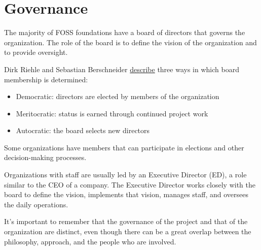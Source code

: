 


\chapter{Governance}

The majority of FOSS foundations have a board of directors that governs the organization.  The role of the board is to define the vision of the organization and to provide oversight.

Dirk Riehle and Sebastian Berschneider \href{https://doi.org/10.1007/978-3-642-33442-9_2}{describe} three ways in which board membership is determined:

\begin{itemize}

\item Democratic: directors are elected by members of the organization

\item Meritocratic: status is earned through continued project work

\item Autocratic: the board selects new directors

\end{itemize}

Some organizations have members that can participate in elections and other decision-making processes.

Organizations with staff are usually led by an Executive Director (ED), a role similar to the CEO of a company.  The Executive Director works closely with the board to define the vision, implements that vision, manages staff, and oversees the daily operations.

It's important to remember that the governance of the project and that of the organization are distinct, even though there can be a great overlap between the philosophy, approach, and the people who are involved.

\newpage

